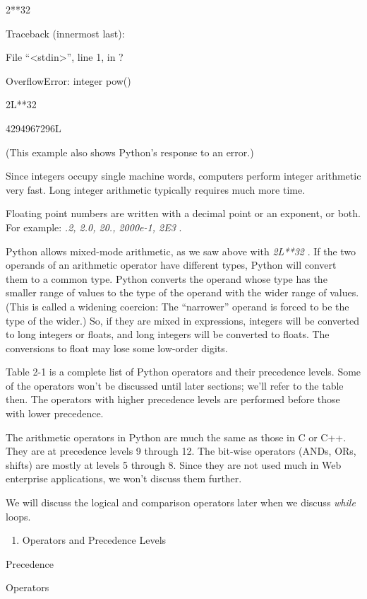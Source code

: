 2**32

Traceback (innermost last):

 File
``\textless{}stdin\textgreater{}'', line 1, in ?

OverflowError: integer pow()


2L**32

4294967296L

(This example also shows Python's
response to an error.)

Since integers occupy single
machine words, computers perform integer arithmetic very fast. Long
integer arithmetic typically requires much more time.

Floating point numbers are written
with a decimal point or an exponent, or both. For example: \emph{.2,
2.0, 20., 2000e-1, 2E3} .

Python allows mixed-mode
arithmetic, as we saw above with \emph{2L**32} . If the two operands of
an arithmetic operator have different types, Python will convert them to
a common type. Python converts the operand whose type has the smaller
range of values to the type of the operand with the wider range of
values. (This is called a widening coercion: The ``narrower'' operand is
forced to be the type of the wider.) So, if they are mixed in
expressions, integers will be converted to long integers or floats, and
long integers will be converted to floats. The conversions to float may
lose some low-order digits.


Table 2-1 is a complete list of
Python operators and their precedence levels. Some of the operators
won't be discussed until later sections; we'll refer to the table then.
The operators with higher precedence levels are performed before those
with lower precedence.

The arithmetic operators in Python
are much the same as those in C or C++. They are at precedence levels 9
through 12. The bit-wise operators (ANDs, ORs, shifts) are mostly at
levels 5 through 8. Since they are not used much in Web enterprise
applications, we won't discuss them further.

We will discuss the logical and
comparison operators later when we discuss \emph{while} loops.

\begin{enumerate}
\tightlist
\item Operators and Precedence Levels
\end{enumerate}

Precedence

Operators

